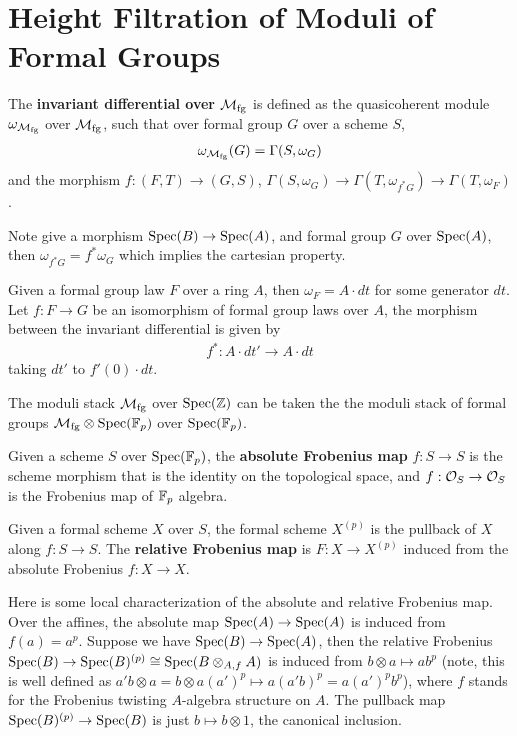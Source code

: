 \section{Height Filtration of Moduli of Formal Groups}\label{sec:formalgroups-filtration}

\begin{definition}
    The \textbf{invariant differential over $\mathcal{M}_{\mathrm{fg}}$} is defined as the quasicoherent module $\omega_{\mathcal{M}_{\mathrm{fg}}}$ over $\mathcal{M}_{\mathrm{fg}}$, such that over formal group $G$ over a scheme $S$,
    \begin{align*}
        \omega_{\mathcal{M}_{\mathrm{fg}}}(G)=\Gamma(S, \omega_G)
    \end{align*}and the morphism $f: (F,T)\to (G,S)$, $\Gamma(S,\omega_{{G}})\to \Gamma(T,\omega_{f^*{G}})\to \Gamma(T,\omega_F)$.

    Note give a morphism $\operatorname{\mathrm{Spec}}(B)\to \operatorname{\mathrm{Spec}}(A)$, and formal group $G$ over $\operatorname{\mathrm{Spec}}(A)$, then $\omega_{f^*G}=f^*\omega_{G}$ which implies the cartesian property.
\end{definition}

Given a formal group law $F$ over a ring $A$, then $\omega_F=A\cdot dt$ for some generator $dt$. Let $f:F\to G$ be an isomorphism of formal group laws over $A$, the morphism between the invariant differential is given by
\begin{align*}
    f^*: A\cdot dt' \to A \cdot dt
\end{align*}taking $dt'$ to $f'(0) \cdot dt$.

The moduli stack $\mathcal{M}_{\mathrm{fg}}$ over $\operatorname{\mathrm{Spec}}(\mathbb{Z})$ can be taken the the moduli stack of formal groups $\mathcal{M}_{\mathrm{fg}}\otimes\operatorname{\mathrm{Spec}}(\mathbb{F}_p)$ over $\operatorname{\mathrm{Spec}}(\mathbb{F}_p)$. 

\begin{definition}
    Given a scheme $S$ over $\operatorname{\mathrm{Spec}}(\mathbb{F}_p)$, the \textbf{absolute Frobenius map} $f: S \to S$ is the scheme morphism that is the identity on the topological space, and $f: \mathcal{O}_S\to \mathcal{O}_S$ is the Frobenius map of $\mathbb{F}_p$ algebra.

    Given a formal scheme $X$ over $S$, the formal scheme $X^{(p)}$ is the pullback of $X$ along $f:S\to S$. The \textbf{relative Frobenius map} is $F: X\to X^{(p)}$ induced from the absolute Frobenius $f:X\to X$.
\end{definition}

\begin{remark}
    Here is some local characterization of the absolute and relative Frobenius map. Over the affines, the absolute map $\operatorname{\mathrm{Spec}}(A)\to \operatorname{\mathrm{Spec}}(A)$ is induced from $f(a)=a^p$. 
    Suppose we have $\operatorname{\mathrm{Spec}}(B)\to \operatorname{\mathrm{Spec}}(A)$, then the relative Frobenius $\operatorname{\mathrm{Spec}}(B)\to \operatorname{\mathrm{Spec}}(B)^{(p)}\cong \operatorname{\mathrm{Spec}}(B\otimes _{A, f}A)$ is induced from $b\otimes a\mapsto ab^p$ (note, this is well defined as $a'b\otimes a=b\otimes a (a')^p\mapsto a(a'b)^p=a(a')^pb^p$), where $f$ stands for the Frobenius twisting $A$-algebra structure on $A$.
    The pullback map $\operatorname{\mathrm{Spec}}(B)^{(p)}\to \operatorname{\mathrm{Spec}}(B)$ is just $b\mapsto b\otimes 1$, the canonical inclusion.
\end{remark}

